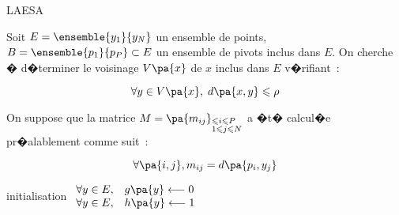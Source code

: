             \begin{xalgorithm}{LAESA}
            \label{space_metric_algo_laesa}
            
            Soit $E = \ensemble{y_1}{y_N}$ un ensemble de points, $B = \ensemble{p_1}{p_P} \subset E$ 
            un ensemble de pivots inclus dans $E$. On cherche � d�terminer le voisinage $V\pa{x}$ de $x$ 
            inclus dans $E$ v�rifiant~:
            
                        $$
                        \forall y \in V\pa{x}, \; d\pa{x,y} \leqslant \rho
                        $$
                        
            On suppose que la matrice $M = \pa{m_{ij}}_ { \begin{subarray} 1 \leqslant i \leqslant P \\ 
            1 \leqslant j \leqslant N \end{subarray} }$ a �t� calcul�e pr�alablement comme suit~:
            
                        $$
                        \forall \pa{i,j}, m_{ij} = d\pa{p_i, y_j}
                        $$
                        
            \begin{xalgostep}{initialisation}
                $\begin{array}{ll}
                \forall y \in E, & g\pa{y} \longleftarrow 0 \\
                \forall y \in E, & h\pa{y} \longleftarrow 1
                \end{array}$
            \end{xalgostep}        
            

\end{xalgorithm}
